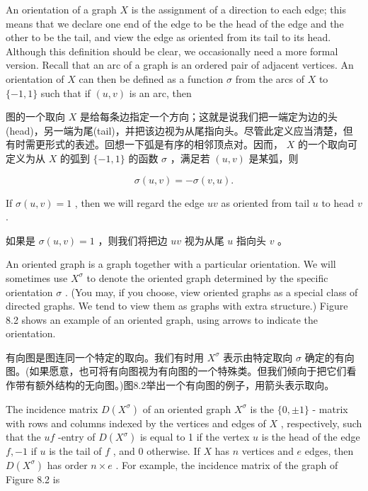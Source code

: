 \documentclass[10pt]{article}
\begin{document}
An orientation of a graph \(X\) is the assignment of a direction to each edge; this means that we declare one end of the edge to be the head of the edge and the other to be the tail, and view the edge as oriented from its tail to its head. Although this definition should be clear, we occasionally need a more formal version. Recall that an arc of a graph is an ordered pair of adjacent vertices. An orientation of \(X\) can then be defined as a function \(\sigma\) from the arcs of \(X\) to \(\{  - 1,1\}\) such that if \(\left( {u,v}\right)\) is an arc, then

\begin{tcolorbox}\relax
图的一个取向 \(X\) 是给每条边指定一个方向；这就是说我们把一端定为边的头(head)，另一端为尾(tail)，并把该边视为从尾指向头。尽管此定义应当清楚，但有时需更形式的表述。回想一下弧是有序的相邻顶点对。因而， \(X\) 的一个取向可定义为从 \(X\) 的弧到 \(\{  - 1,1\}\) 的函数 \(\sigma\) ，满足若 \(\left( {u,v}\right)\) 是某弧，则
\end{tcolorbox}

\[
\sigma \left( {u,v}\right)  =  - \sigma \left( {v,u}\right) .
\]

If \(\sigma \left( {u,v}\right)  = 1\) , then we will regard the edge \({uv}\) as oriented from tail \(u\) to head \(v\) .

\begin{tcolorbox}\relax
如果是 \(\sigma \left( {u,v}\right)  = 1\) ，则我们将把边 \({uv}\) 视为从尾 \(u\) 指向头 \(v\) 。
\end{tcolorbox}

An oriented graph is a graph together with a particular orientation. We will sometimes use \({X}^{\sigma }\) to denote the oriented graph determined by the specific orientation \(\sigma\) . (You may, if you choose, view oriented graphs as a special class of directed graphs. We tend to view them as graphs with extra structure.) Figure 8.2 shows an example of an oriented graph, using arrows to indicate the orientation.

\begin{tcolorbox}\relax
有向图是图连同一个特定的取向。我们有时用 \({X}^{\sigma }\) 表示由特定取向 \(\sigma\) 确定的有向图。(如果愿意，也可将有向图视为有向图的一个特殊类。但我们倾向于把它们看作带有额外结构的无向图。)图8.2举出一个有向图的例子，用箭头表示取向。
\end{tcolorbox}

The incidence matrix \(D\left( {X}^{\sigma }\right)\) of an oriented graph \({X}^{\sigma }\) is the \(\{ 0, \pm  1\}\) - matrix with rows and columns indexed by the vertices and edges of \(X\) , respectively, such that the \({uf}\) -entry of \(D\left( {X}^{\sigma }\right)\) is equal to 1 if the vertex \(u\) is the head of the edge \(f, - 1\) if \(u\) is the tail of \(f\) , and 0 otherwise. If \(X\) has \(n\) vertices and \(e\) edges, then \(D\left( {X}^{\sigma }\right)\) has order \(n \times  e\) . For example, the incidence matrix of the graph of Figure 8.2 is
\end{document}
